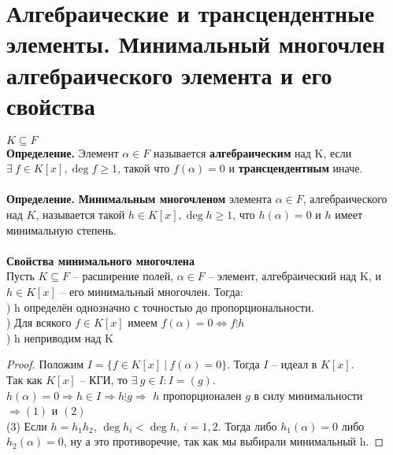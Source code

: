 \section{Алгебраические и трансцендентные элементы. Минимальный многочлен алгебраического элемента и его свойства}

$K\subseteq F$\\
\textbf{Определение.} Элемент $\alpha\in F$ называется \textbf{алгебраическим} над K, если $\exists\ f\in K[x], \deg{f}\geqslant 1$, такой что $f(\alpha)=0$ и \textbf{трансцендентным} иначе.\\\\
\textbf{Определение.} \textbf{Минимальным многочленом} элемента $\alpha\in F$, алгебраического над $K$, называется такой $h\in K[x],\deg{h}\geqslant 1$, что $h(\alpha)=0$ и $h$ имеет минимальную степень.\\\\
\textbf{Свойства минимального многочлена}\\
Пусть $K\subseteq F$ -- расширение полей, $\alpha \in F$ -- элемент, алгебраический над K, и $h\in K[x]$ -- его минимальный многочлен. Тогда:\\
) h определён однозначно с точностью до пропорциональности.\\
) Для всякого $f\in K[x]$ имеем $f(\alpha)=0\Leftrightarrow f\vdots h$\\
) h неприводим над K
\begin{proof}
    Положим $I=\{ f\in K[x] \ | \ f(\alpha)=0\}$. Тогда $I$ -- идеал в $K[x]$. \\
    Так как $K[x]$ -- КГИ, то $\exists \ g\in I: I=(g)$.\\
    $h(\alpha)=0\Rightarrow h\in I\Rightarrow h\vdots g\Rightarrow$ $h$ пропорционален $g$ в силу минимальности $\Rightarrow (1)$ и $(2)$\\
    (3) Если $h=h_1h_2$, $\deg{h_i}<\deg{h}, \ i=1,2$. Тогда либо $h_1(\alpha)=0$ либо $h_2(\alpha)=0$, ну а это противоречие, так как мы выбирали минимальный h. 
\end{proof}